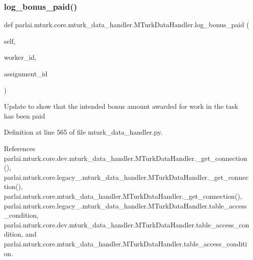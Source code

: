\subsubsection{\texorpdfstring{log\+\_\+bonus\+\_\+paid()}{log\_bonus\_paid()}}
{\footnotesize\ttfamily def parlai.\+mturk.\+core.\+mturk\+\_\+data\+\_\+handler.\+M\+Turk\+Data\+Handler.\+log\+\_\+bonus\+\_\+paid (\begin{DoxyParamCaption}\item[{}]{self,  }\item[{}]{worker\+\_\+id,  }\item[{}]{assignment\+\_\+id }\end{DoxyParamCaption})}

\begin{DoxyVerb}Update to show that the intended bonus amount awarded for work
in the task has been paid
\end{DoxyVerb}
 

Definition at line 565 of file mturk\+\_\+data\+\_\+handler.\+py.



References parlai.\+mturk.\+core.\+dev.\+mturk\+\_\+data\+\_\+handler.\+M\+Turk\+Data\+Handler.\+\_\+get\+\_\+connection(), parlai.\+mturk.\+core.\+legacy\+\_.\+mturk\+\_\+data\+\_\+handler.\+M\+Turk\+Data\+Handler.\+\_\+get\+\_\+connection(), parlai.\+mturk.\+core.\+mturk\+\_\+data\+\_\+handler.\+M\+Turk\+Data\+Handler.\+\_\+get\+\_\+connection(), parlai.\+mturk.\+core.\+legacy\+\_.\+mturk\+\_\+data\+\_\+handler.\+M\+Turk\+Data\+Handler.\+table\+\_\+access\+\_\+condition, parlai.\+mturk.\+core.\+dev.\+mturk\+\_\+data\+\_\+handler.\+M\+Turk\+Data\+Handler.\+table\+\_\+access\+\_\+condition, and parlai.\+mturk.\+core.\+mturk\+\_\+data\+\_\+handler.\+M\+Turk\+Data\+Handler.\+table\+\_\+access\+\_\+condition.

